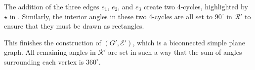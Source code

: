 \documentclass{theoretics}
\newcommand{\RR}{\mathcal{R}}
\newcommand{\EE}{\mathcal{E}}
\begin{document}
The addition of the three edges $e_1$, $e_2$, and $e_3$ create two 4-cycles, highlighted by $\star$ in . Similarly, the interior angles in these two 4-cycles  are all set to $90^\circ$ in $\RR'$ to ensure that they must be drawn as rectangles.

This finishes the construction of $(G',\EE')$, which is a biconnected simple plane graph.
All remaining angles in $\RR'$ are set in such a way that the sum of angles surrounding each vertex is $360^\circ$.
\end{document}
